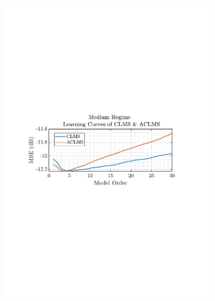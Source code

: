 \documentclass[12pt]{article}
\begin{document}
\begin{figure}[H]
\begin{subfigure}{0.49\textwidth}
					\includegraphics[trim={2.2cm 11.2cm 3.15cm  11.2cm}, clip, width=\textwidth]{../MATLAB/figures/q3_1b_fig06.pdf} 
				\end{subfigure}
				\begin{subfigure}{0.49\textwidth}
					\centering

\end{subfigure}
\end{figure}
\end{document}
